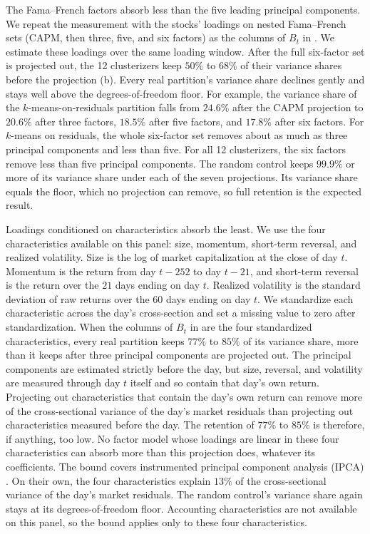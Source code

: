 The Fama--French factors absorb less than the five leading principal components. We repeat the measurement with the stocks' loadings on nested Fama--French sets (CAPM, then three, five, and six factors) as the columns of $B_t$ in . We estimate these loadings over the same loading window. After the full six-factor set is projected out, the 12 clusterizers keep
$50\%$ to $68\%$ of their variance shares before the projection
(b). Every real partition's variance share declines gently and stays well above
the degrees-of-freedom floor. For example, the variance share of the $k$-means-on-residuals partition falls from $24.6\%$ after the CAPM projection to $20.6\%$ after three factors, $18.5\%$ after five factors, and $17.8\%$ after six factors. For $k$-means on residuals, the whole six-factor set removes about as much as three principal components and less than five. For all 12 clusterizers, the six factors remove less than five principal components. The random control keeps $99.9\%$ or more of its variance share under each of the seven projections. Its variance share equals the floor, which no projection can remove, so full retention is the expected result.

Loadings conditioned on characteristics absorb the least. We use the four
characteristics available on this panel: size, momentum, short-term
reversal, and realized volatility. Size is the log of market capitalization at the close of day $t$. Momentum is the return from day $t-252$ to day $t-21$, and short-term reversal is the return over the $21$ days ending on day $t$. Realized volatility is the standard deviation of raw returns over the $60$ days ending on day $t$. We standardize each characteristic across the day's cross-section and set a missing value to zero after standardization. When the columns of $B_t$ in  are the four standardized characteristics, every real partition keeps
$77\%$ to $85\%$ of its variance share, more than it keeps after three principal
components are projected out. The principal components are estimated strictly before the day, but size, reversal, and volatility are measured through day $t$ itself and so contain that day's own return. Projecting out characteristics that contain the day's own return can remove more of the cross-sectional variance of the day's market residuals than projecting out characteristics measured before the day. The retention of $77\%$ to $85\%$ is therefore, if anything, too low. No factor model whose loadings are linear in these four characteristics can absorb more than this projection does, whatever its coefficients. The bound covers instrumented principal component analysis (IPCA) \citep{kelly2019characteristics}. On their own, the four characteristics explain $13\%$ of the cross-sectional variance of the day's market residuals. The random control's variance share again stays at its degrees-of-freedom floor. Accounting characteristics are not available on this panel, so the bound applies only to these four characteristics.

